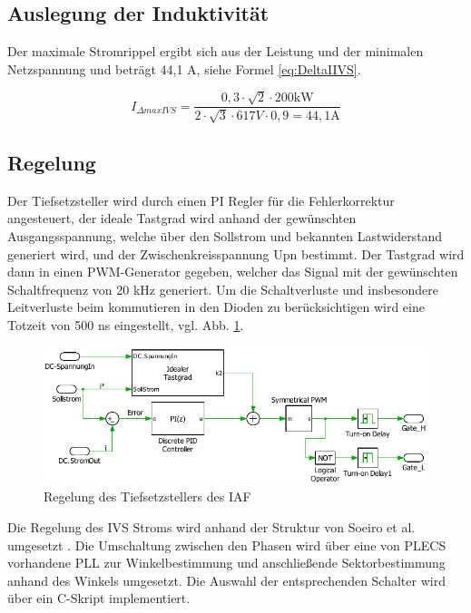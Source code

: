 	\cite{IAF99}
	
	\subsection{Auslegung der Induktivität}
	Der maximale Stromrippel ergibt sich aus der Leistung und der minimalen Netzspannung und beträgt 44,1 \si{\A}, siehe Formel \ref{eq:DeltaIIVS}.
	
	\begin{equation}
	\label{eq:DeltaIIVS}
	I_{\Delta max IVS}= \dfrac{0,3\cdot \sqrt{2} \cdot 200 \si{\kilo \watt}}{2 \cdot \sqrt{3} \cdot 617 \si{V} \cdot 0,9 = 44,1 \si{\A}}
	\end{equation}
	
	\subsection{Regelung}
	Der Tiefsetzsteller wird durch einen PI Regler für die Fehlerkorrektur angesteuert, der ideale Tastgrad wird anhand der gewünschten Ausgangsspannung, welche über den Sollstrom und bekannten Lastwiderstand generiert wird, und der Zwischenkreisspannung \gls{Upn} bestimmt. Der Tastgrad wird dann in einen PWM-Generator gegeben, welcher das Signal mit der gewünschten Schaltfrequenz von 20 kHz generiert. Um die Schaltverluste und insbesondere Leitverluste beim kommutieren in den Dioden zu berücksichtigen wird eine Totzeit von 500 \si{\nano \second} eingestellt, vgl. Abb. \ref{fig:iafbuckcontrol}.
	\begin{figure}
		\centering
		\includegraphics[width=0.9\linewidth]{content/Grafiken/IAF_BuckControl}
		\caption{Regelung des Tiefsetzstellers des IAF}
		\label{fig:iafbuckcontrol}
	\end{figure}
	
	Die Regelung des \gls{IVS} Stroms wird anhand der Struktur von Soeiro et al. umgesetzt \cite{Soeiro.2013}. Die Umschaltung zwischen den Phasen wird über eine von \gls{PLECS} vorhandene \gls{PLL} zur Winkelbestimmung und anschließende Sektorbestimmung anhand des Winkels umgesetzt. Die Auswahl der entsprechenden Schalter wird über ein C-Skript implementiert. 
	
